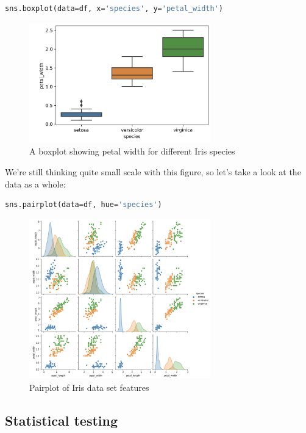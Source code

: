 \documentclass[12pt]{article}
\begin{document}
\begin{lstlisting}[language=Python]
    sns.boxplot(data=df, x='species', y='petal_width')
\end{lstlisting}

\begin{figure}[!h]
    \centering
    \includegraphics[width=0.7\textwidth]{figures/ssIM4.png}
    \caption{A boxplot showing petal width for different Iris species}
\end{figure}

We're still thinking quite small scale with this figure, so let's take a look at the data as a whole:

\begin{lstlisting}[language=Python]
    sns.pairplot(data=df, hue='species')
\end{lstlisting}

\begin{figure}[!h]
    \centering
    \includegraphics[width=0.7\textwidth]{figures/ssIM5.png}
    \caption{Pairplot of Iris data set features}
\end{figure}

\subsection{Statistical testing} 
\end{document}
